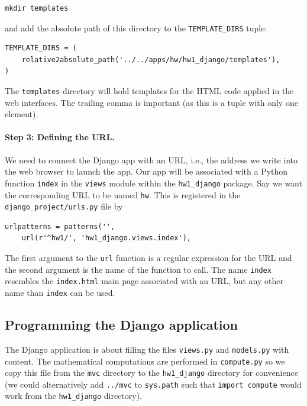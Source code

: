 \documentclass[%
oneside,                 %
final,                   %
10pt]{article}
\begin{document}
\begin{Verbatim}[numbers=none,fontsize=\fontsize{9pt}{9pt},baselinestretch=0.85]
mkdir templates
\end{Verbatim}
and add the absolute path of this directory to the \Verb!TEMPLATE_DIRS! tuple:

\begin{Verbatim}[numbers=none,fontsize=\fontsize{9pt}{9pt},baselinestretch=0.85]
TEMPLATE_DIRS = (
    relative2absolute_path('../../apps/hw/hw1_django/templates'),
)
\end{Verbatim}
The \Verb!templates! directory will hold templates for the HTML code applied
in the web interfaces. The trailing comma is important (as this is
a tuple with only one element).

\paragraph{Step 3: Defining the URL.}
We need to connect the Django app with
an URL, i.e., the address we write into the web browser to launch the
app. Our app will be associated with a Python function \Verb!index!
in the \Verb!views! module within the \Verb!hw1_django! package.
Say we want the corresponding URL to
be named \Verb!hw!. This is registered in the \Verb!django_project/urls.py! file
by

\begin{Verbatim}[numbers=none,fontsize=\fontsize{9pt}{9pt},baselinestretch=0.85]
urlpatterns = patterns('',
    url(r'^hw1/', 'hw1_django.views.index'),
\end{Verbatim}
The first argument to the \Verb!url! function is a regular expression for
the URL and the second argument is the name of the function to call.
The name \Verb!index! resembles the \Verb!index.html! main page associated
with an URL, but any other name than \Verb!index! can be used.

\subsection{Programming the Django application}



The Django application is about filling the files \Verb!views.py! and \Verb!models.py!
with content. The mathematical computations are performed in \Verb!compute.py!
so we copy this file from the \Verb!mvc! directory to the \Verb!hw1_django! directory
for convenience (we could alternatively add \Verb!../mvc! to \Verb!sys.path! such that
\Verb!import compute! would work from the \Verb!hw1_django! directory).
\end{document}
